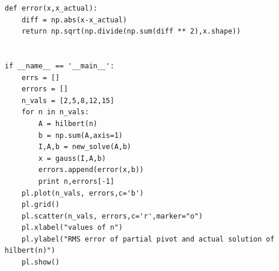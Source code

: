 \documentclass[a4paper,11pt]{article}
\begin{document}
{\begin{lstlisting}
def error(x,x_actual):
    diff = np.abs(x-x_actual)
    return np.sqrt(np.divide(np.sum(diff ** 2),x.shape))


if __name__ == '__main__':
    errs = []
    errors = []
    n_vals = [2,5,8,12,15]
    for n in n_vals:
        A = hilbert(n)
        b = np.sum(A,axis=1) 
        I,A,b = new_solve(A,b)
        x = gauss(I,A,b)
        errors.append(error(x,b))
        print n,errors[-1]
    pl.plot(n_vals, errors,c='b')
    pl.grid()
    pl.scatter(n_vals, errors,c='r',marker="o")
    pl.xlabel("values of n")
    pl.ylabel("RMS error of partial pivot and actual solution of hilbert(n)")
    pl.show()

\end{lstlisting}
}
\end{document}
